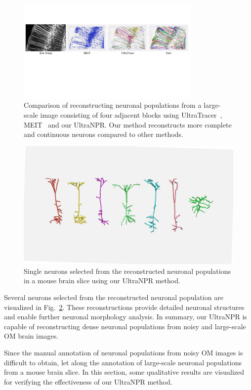 \begin{figure}[t]
	\centering
	\includegraphics[width=0.8\textwidth]{./Illustrations/comparison_ultranpr.pdf}
	\caption{Comparison of reconstructing neuronal populations from a large-scale image consisting of four adjacent blocks using UltraTracer~\cite{Peng2017}, MEIT~\cite{Wang2018} and our UltraNPR. Our method reconstructs more complete and continuous neurons compared to other methods. 
	}
	\label{fig:reconstruct_blocks}
\end{figure}



\begin{figure}[t]
	\centering
	\includegraphics[width=0.8\columnwidth]{./Illustrations/single_neurons4.pdf}
	\caption{Single neurons selected from the reconstructed neuronal populations in a mouse brain slice using our UltraNPR method.}
	\label{fig:single_neurons}
\end{figure}


Several neurons selected from the reconstructed neuronal population are visualized in Fig.~\ref{fig:single_neurons}. These reconstructions provide detailed neuronal structures and enable further neuronal morphology analysis. 
In summary, our UltraNPR is capable of reconstructing dense neuronal populations from noisy and large-scale OM brain images.

Since the manual annotation of neuronal populations from noisy OM images is difficult to obtain, let along the annotation of large-scale neuronal populations from a mouse brain slice. In this section, some qualitative results are visualized for verifying the effectiveness of our UltraNPR method.